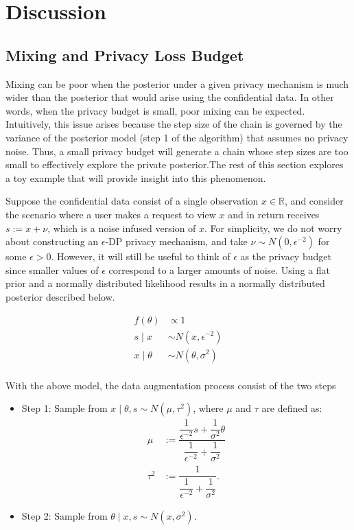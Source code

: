\hypertarget{discussion}{%
\section{Discussion}\label{discussion}}

\hypertarget{mixing-and-privacy-loss-budget}{%
\subsection{Mixing and Privacy Loss Budget}\label{mixing-and-privacy-loss-budget}}

Mixing can be poor when the posterior under a given privacy mechanism is
much wider than the posterior that would arise using the confidential data. In
other words, when the privacy budget is small, poor mixing can be expected. Intuitively,
this issue arises because the step size of the chain is governed by the variance
of the posterior model (step 1 of the algorithm) that assumes no privacy noise. Thus, a small privacy budget
will generate a chain whose step sizes are too small to effectively explore the
private posterior.The rest of this section explores a toy example that will provide insight into this
phenomenon.

Suppose the confidential data consist of a single observation \(x \in \mathbb{R}\),
and consider the scenario where a user makes a request to view \(x\) and
in return receives \(s := x + \nu\), which is a noise infused version of \(x\).
For simplicity, we do not worry about constructing an \(\epsilon\)-DP privacy mechanism,
and take \(\nu \sim N(0, \epsilon^{-2})\) for some \(\epsilon > 0\). However, it
will still be useful to think of \(\epsilon\) as the privacy budget since smaller values
of \(\epsilon\) correspond to a larger amounts of noise. Using
a flat prior and a normally distributed likelihood results in
a normally distributed posterior described below.

\[
\begin{aligned}
f(\theta) &\propto 1\\
s \mid x &\sim N(x, \epsilon^{-2})\\
x \mid \theta &\sim N(\theta, \sigma^2)\\
\end{aligned}
\]

With the above model, the data augmentation process consist of the
two steps

\begin{itemize}
\item
  Step 1: Sample from \(x \mid \theta, s \sim N(\mu, \tau^2)\), where
  \(\mu\) and \(\tau\) are defined as:
  \[
  \begin{aligned}
  \mu &:= \dfrac{\dfrac{1}{\epsilon^{-2}}s + \dfrac{1}{\sigma^2}\theta}{\dfrac{1}{\epsilon^{-2}} + \dfrac{1}{\sigma^2}}\\
  \tau^2 &:= \dfrac{1}{\dfrac{1}{\epsilon^{-2}} + \dfrac{1}{\sigma^2}}.
  \end{aligned}
  \]
\item
  Step 2: Sample from \(\theta \mid x, s \sim N(x, \sigma^2)\).
\end{itemize}

